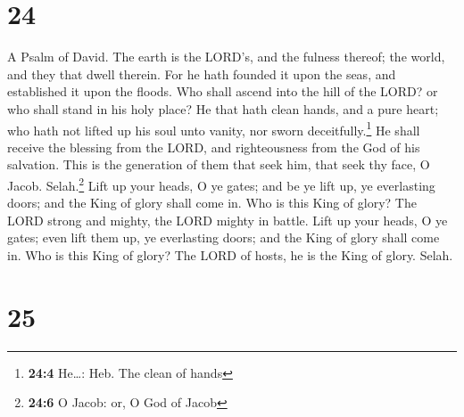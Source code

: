 \hypertarget{section-23}{%
\section{24}\label{section-23}}

A Psalm of David.  The earth is the LORD's, and the
fulness thereof; the world, and they that dwell therein. 
For he hath founded it upon the seas, and established it upon the
floods.  Who shall ascend into the hill of the LORD? or
who shall stand in his holy place?  He that hath clean
hands, and a pure heart; who hath not lifted up his soul unto vanity,
nor sworn deceitfully.\footnote{\textbf{24:4} He\ldots: Heb. The clean
  of hands}  He shall receive the blessing from the LORD,
and righteousness from the God of his salvation.  This is
the generation of them that seek him, that seek thy face, O Jacob.
Selah.\footnote{\textbf{24:6} O Jacob: or, O God of Jacob}
 Lift up your heads, O ye gates; and be ye lift up, ye
everlasting doors; and the King of glory shall come in. 
Who is this King of glory? The LORD strong and mighty, the LORD mighty
in battle.  Lift up your heads, O ye gates; even lift them
up, ye everlasting doors; and the King of glory shall come in.
 Who is this King of glory? The LORD of hosts, he is the
King of glory. Selah.

\hypertarget{section-24}{%
\section{25}\label{section-24}}

